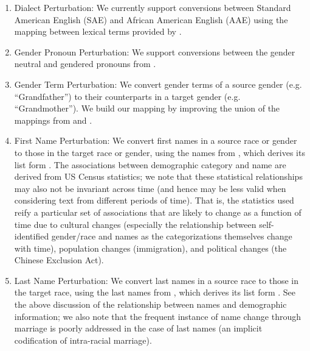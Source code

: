 \begin{enumerate}
  \item Dialect Perturbation: We currently support conversions between Standard American English (SAE) and African American English (AAE) using the mapping between lexical terms provided by \citet{ziems2022value}.
  \item Gender Pronoun Perturbation: We support conversions between the gender neutral and gendered pronouns from \citet{lauscher2022pronouns}.
  \item Gender Term Perturbation: We convert gender terms of a source gender (e.g. ``Grandfather'') to their counterparts in a target gender (e.g. ``Grandmother''). 
  We build our mapping by improving the union of the mappings from \citet{garg2018stereotypes} and \citet{bolukbasi2016man}.
  \item First Name Perturbation: We convert first names in a source race or gender to those in the target race or gender, using the names from \citet{caliskan2017semantics}, which derives its list form \citet{greenwald1998measuring}.
  The associations between demographic category and name are derived from US Census statistics; we note that these statistical relationships may also not be invariant across time (and hence may be less valid when considering text from different periods of time).
  That is, the statistics used reify a particular set of associations that are likely to change as a function of time due to cultural changes (especially the relationship between self-identified gender/race and names as the categorizations themselves change with time), population changes (\eg immigration),  and political changes (\eg the Chinese Exclusion Act).
  \item Last Name Perturbation: We convert last names in a source race to those in the target race, using the last names from \citet{garg2018stereotypes}, which derives its list form \citet{chalabi2017dear}.
  See the above discussion of the relationship between names and demographic information; we also note that the frequent instance of name change through marriage is poorly addressed in the case of last names (\ie an implicit codification of intra-racial marriage).
\end{enumerate}